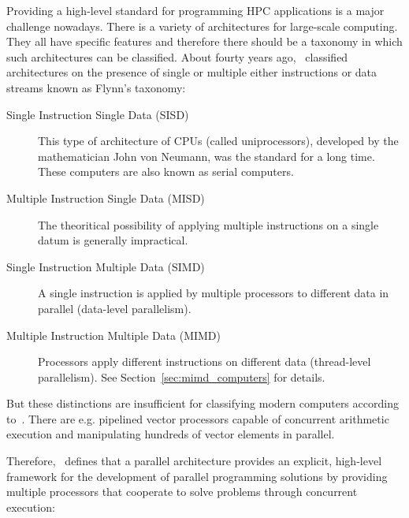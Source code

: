 Providing a high-level standard for programming HPC applications is a
major challenge nowadays. There is a variety of architectures for
large-scale computing. They all have specific features and 
therefore there should be a taxonomy in which such architectures can
be classified. About fourty years ago, \cite{flynn72sco}~classified
architectures on the
presence of single or multiple either instructions or data streams
known as Flynn's taxonomy:
\begin{description}
\item[Single Instruction Single Data (SISD)]
  This type of architecture of CPUs (called uniprocessors),
  developed by the 
  mathematician John von Neumann, was the standard for a long
  time. These computers are also known as serial computers. 
\item[Multiple Instruction Single Data (MISD)] The theoritical possibility
  of applying multiple instructions on a single datum is generally
  impractical.
\item[Single Instruction Multiple Data (SIMD)] 
  A single instruction is applied by multiple processors to different
  data in parallel (data-level parallelism). 
\item[Multiple Instruction Multiple Data (MIMD)] Processors apply
  different instructions on different data (thread-level
  parallelism). See Section~\ref{sec:mimd_computers} for details. 
\end{description}

But these distinctions are insufficient for classifying modern
computers according to~\cite{duncan90survey}. There are e.g.
pipelined vector processors capable of concurrent arithmetic execution and
manipulating hundreds of vector elements in parallel.

Therefore,~\cite{duncan90survey} defines that a parallel architecture
provides an explicit, high-level framework for 
the development of parallel programming solutions by providing
multiple processors that cooperate to solve problems through
concurrent execution:


